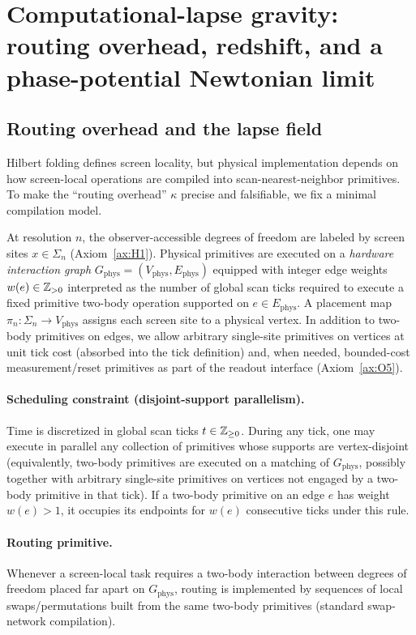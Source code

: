 
\section[Computational-lapse gravity]{Computational-lapse gravity: routing overhead, redshift, and a phase-potential Newtonian limit}
\label{sec:gravity}

\subsection{Routing overhead and the lapse field}
\label{sec:lapse_definition}

Hilbert folding defines screen locality, but physical implementation depends on how screen-local operations are compiled into scan-nearest-neighbor primitives.
To make the ``routing overhead'' $\kappa$ precise and falsifiable, we fix a minimal compilation model.

\begin{assumption}
\label{ass:hardware_graph}
At resolution $n$, the observer-accessible degrees of freedom are labeled by screen sites $x\in\Sigma_n$ (Axiom~\ref{ax:H1}).
Physical primitives are executed on a \emph{hardware interaction graph} $G_{\mathrm{phys}}=(V_{\mathrm{phys}},E_{\mathrm{phys}})$ equipped with integer edge weights $w(e)\in\mathbb{Z}_{>0}$ interpreted as the number of global scan ticks required to execute a fixed primitive two-body operation supported on $e\in E_{\mathrm{phys}}$.
A placement map $\pi_n:\Sigma_n\to V_{\mathrm{phys}}$ assigns each screen site to a physical vertex.
In addition to two-body primitives on edges, we allow arbitrary single-site primitives on vertices at unit tick cost (absorbed into the tick definition) and, when needed, bounded-cost measurement/reset primitives as part of the readout interface (Axiom~\ref{ax:O5}).

\paragraph{Scheduling constraint (disjoint-support parallelism).}
Time is discretized in global scan ticks $t\in\mathbb{Z}_{\ge 0}$.
During any tick, one may execute in parallel any collection of primitives whose supports are vertex-disjoint (equivalently, two-body primitives are executed on a matching of $G_{\mathrm{phys}}$, possibly together with arbitrary single-site primitives on vertices not engaged by a two-body primitive in that tick).
If a two-body primitive on an edge $e$ has weight $w(e)>1$, it occupies its endpoints for $w(e)$ consecutive ticks under this rule.

\paragraph{Routing primitive.}
Whenever a screen-local task requires a two-body interaction between degrees of freedom placed far apart on $G_{\mathrm{phys}}$, routing is implemented by sequences of local swaps/permutations built from the same two-body primitives (standard swap-network compilation).
\end{assumption}

